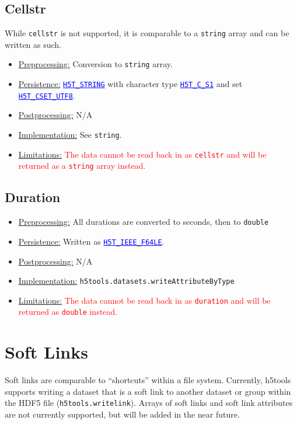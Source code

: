 \documentclass[11pt]{exam}
\newcommand\myurl[1]{\textcolor{blue}{\underline{#1}}}
\newcommand\myfcn[1]{\colorbox{codegray}{\textcolor{codeblue}{\texttt{#1}}}}
\newcommand\hdftype[1]{\texttt{\myurl{#1}}}
\begin{document}
		
		\subsection{Cellstr}
		\noindent While \texttt{cellstr} is not supported, it is comparable to a \texttt{string} array and can be written as such.  
		\begin{itemize}
			\item \underline{Preprocessing:} Conversion to \texttt{string} array.
			\item \underline{Persistence:} \hdftype{H5T\_STRING} with character type \hdftype{H5T\_C\_S1} and set \hdftype{H5T\_CSET\_UTF8}.
			\item \underline{Postprocessing:} N/A
			\item \underline{Implementation:} See \texttt{string}.
			\item \underline{Limitations:} \textcolor{red}{The data cannot be read back in as \texttt{cellstr} and will be returned as a \texttt{string} array instead.}
		\end{itemize}

		\subsection{Duration}
		\noindent
		\begin{itemize}
			\item \underline{Preprocessing:} All durations are converted to seconds, then to \texttt{double}
			\item \underline{Persistence:} Written as \hdftype{H5T\_IEEE\_F64LE}.
			\item \underline{Postprocessing:} N/A
			\item \underline{Implementation:} \myfcn{h5tools.datasets.writeAttributeByType}
			\item \underline{Limitations:} \textcolor{red}{The data cannot be read back in as \texttt{duration} and will be returned as \texttt{double} instead.}
		\end{itemize}

    \section{Soft Links}
    	\noindent Soft links are comparable to ``shortcuts'' within a file system. Currently, h5tools supports writing a dataset that is a soft link to another dataset or group within the HDF5 file (\myfcn{h5tools.writelink}). Arrays of soft links and soft link attributes are not currently supported, but will be added in the near future. 
\end{document}
